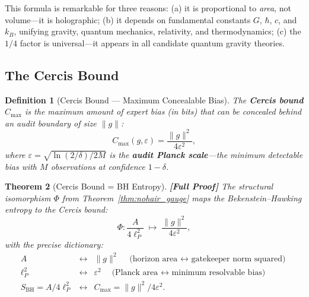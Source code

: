 \documentclass[12pt,a4paper]{article}
\newtheorem{theorem}{Theorem}[section]
\newtheorem{definition}[theorem]{Definition}
\theoremstyle{remark}
\newcommand{\Cercis}{\textsf{Cercis}}
\newcommand{\rigorFull}{\textbf{[Full Proof]}}
\begin{document}
This formula is remarkable for three reasons: (a) it is proportional to \emph{area}, not volume---it is holographic; (b) it depends on fundamental constants $G$, $\hbar$, $c$, and $k_B$, unifying gravity, quantum mechanics, relativity, and thermodynamics; (c) the $1/4$ factor is universal---it appears in all candidate quantum gravity theories.

\subsection{The Cercis Bound}

\begin{definition}[Cercis Bound — Maximum Concealable Bias]
\label{def:cercis_bound}
The \textbf{Cercis bound} $C_{\max}$ is the maximum amount of expert bias (in bits) that can be concealed behind an audit boundary of size $\|g\|$:
\begin{equation}
  \label{eq:cercis_bound}
  C_{\max}(g, \varepsilon) = \frac{\|g\|^2}{4\varepsilon^2},
\end{equation}
where $\varepsilon = \sqrt{\ln(2/\delta) / 2M}$ is the \textbf{audit Planck scale}---the minimum detectable bias with $M$ observations at confidence $1-\delta$.
\end{definition}

\begin{theorem}[Cercis Bound = BH Entropy]
\label{thm:cercis_eq_bh}
\rigorFull
The structural isomorphism $\Phi$ from Theorem~\ref{thm:nohair_gauge} maps the Bekenstein--Hawking entropy to the \Cercis{} bound:
\begin{equation}
  \label{eq:entropy_map}
  \Phi: \frac{A}{4\ell_P^2} \;\longmapsto\; \frac{\|g\|^2}{4\varepsilon^2},
\end{equation}
with the precise dictionary:
\begin{equation}
  \begin{array}{ccl}
    A &\longleftrightarrow& \|g\|^2 \quad \text{(horizon area $\leftrightarrow$ gatekeeper norm squared)} \\[4pt]
    \ell_P^2 &\longleftrightarrow& \varepsilon^2 \quad \text{(Planck area $\leftrightarrow$ minimum resolvable bias)} \\[4pt]
    S_{\text{BH}} = A/4\ell_P^2 &\longleftrightarrow& C_{\max} = \|g\|^2 / 4\varepsilon^2.
  \end{array}
\end{equation}
\end{theorem}
\end{document}
